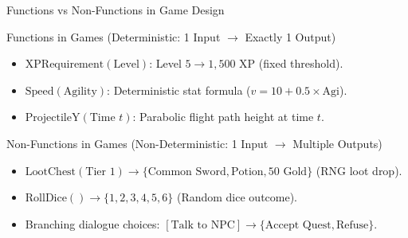 \begin{frame}{Functions vs Non-Functions in Game Design}
\begin{block}{Functions in Games (Deterministic: 1 Input $\rightarrow$ Exactly 1 Output)}
\begin{itemize}
\item $\text{XPRequirement}(\text{Level})$: Level $5 \rightarrow 1,500\text{ XP}$ (fixed threshold). 
\item $\text{Speed}(\text{Agility})$: Deterministic stat formula ($v = 10 + 0.5 \times \text{Agi}$). 
\item $\text{ProjectileY}(\text{Time } t)$: Parabolic flight path height at time $t$.
\end{itemize}
\end{block}

\begin{block}{Non-Functions in Games (Non-Deterministic: 1 Input $\rightarrow$ Multiple Outputs)}
\begin{itemize}
\item $\text{LootChest}(\text{Tier } 1) \rightarrow \{\text{Common Sword}, \text{Potion}, 50\text{ Gold}\}$ (RNG loot drop). 
\item $\text{RollDice}() \rightarrow \{1, 2, 3, 4, 5, 6\}$ (Random dice outcome). 
\item Branching dialogue choices: $[\text{Talk to NPC}] \rightarrow \{\text{Accept Quest}, \text{Refuse}\}$.
\end{itemize}
\end{block}
\end{frame}

